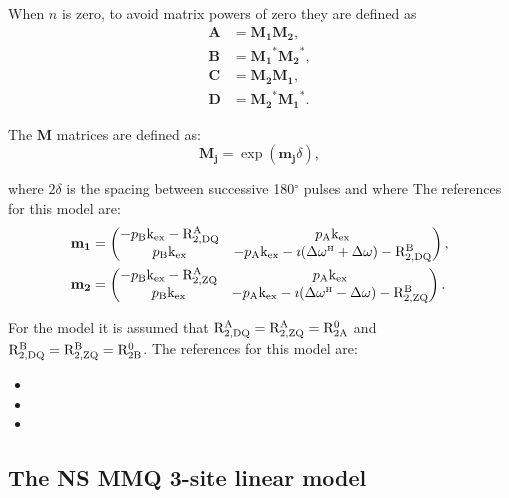 When $n$ is zero, to avoid matrix powers of zero they are defined as
\begin{subequations}
\begin{align}
    \mathbf{A} &= \mathbf{M_1} \mathbf{M_2}, \\
    \mathbf{B} &= \mathbf{M_1}^* \mathbf{M_2}^*, \\
    \mathbf{C} &= \mathbf{M_2} \mathbf{M_1}, \\
    \mathbf{D} &= \mathbf{M_2}^* \mathbf{M_1}^*.
\end{align}
\end{subequations}

The $\mathbf{M}$ matrices are defined as:
\begin{equation}
    \mathbf{M_j} = \exp(\mathbf{m_j}\delta),
\end{equation}

where $2\delta$ is the spacing between successive 180$^\circ$ pulses and where
The references for this model are:
\begin{subequations}
\begin{align}
    \mathbf{m_1} &= \begin{pmatrix}
                        -p_\textrm{B}\textrm{k}_\textrm{ex} - \mathrm{R}_\mathrm{2,DQ}^\mathrm{A} & p_\textrm{A}\textrm{k}_\textrm{ex} \\
                        p_\textrm{B}\textrm{k}_\textrm{ex} & - p_\textrm{A}\textrm{k}_\textrm{ex} -\imath(\Delta\omega^{\scriptscriptstyle\mathrm{H}} + \Delta\omega) - \mathrm{R}_\mathrm{2,DQ}^\mathrm{B} 
                    \end{pmatrix}, \\
    \mathbf{m_2} &=  \begin{pmatrix}
                        -p_\textrm{B}\textrm{k}_\textrm{ex} - \mathrm{R}_\mathrm{2,ZQ}^\mathrm{A} & p_\textrm{A}\textrm{k}_\textrm{ex} \\
                        p_\textrm{B}\textrm{k}_\textrm{ex} & - p_\textrm{A}\textrm{k}_\textrm{ex} -\imath(\Delta\omega^{\scriptscriptstyle\mathrm{H}} - \Delta\omega) - \mathrm{R}_\mathrm{2,ZQ}^\mathrm{B} 
                    \end{pmatrix}.
\end{align}
\end{subequations}

For the model it is assumed that $\mathrm{R}_\mathrm{2,DQ}^\mathrm{A} = \mathrm{R}_\mathrm{2,ZQ}^\mathrm{A} = \mathrm{R}_\mathrm{2A}^0$ and $\mathrm{R}_\mathrm{2,DQ}^\mathrm{B} = \mathrm{R}_\mathrm{2,ZQ}^\mathrm{B} = \mathrm{R}_\mathrm{2B}^0$.
The references for this model are:
\begin{itemize}
\item {}
\item {}
\item {}
\end{itemize}



\subsection{The NS MMQ 3-site linear model}
\label{sect: dispersion: NS MMQ 3-site linear model}

